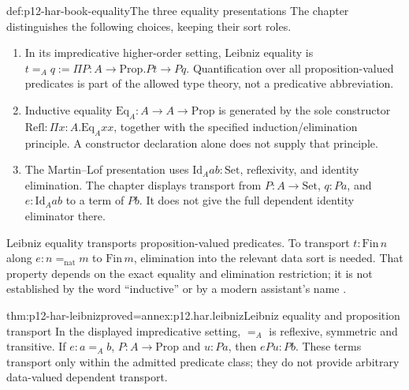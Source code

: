\begin{hbdefinition}{def:p12-har-book-equality}{The three equality presentations}
The chapter distinguishes the following choices, keeping their sort roles.
\begin{enumerate}
 \item In its impredicative higher-order setting, Leibniz equality is
 \(t=_A q:=\Pi P:A\to\mathrm{Prop}.Pt\to Pq\).
 Quantification over all proposition-valued predicates is part of the
 allowed type theory, not a predicative abbreviation.
 \item Inductive equality \(\mathrm{Eq}_A:A\to A\to\mathrm{Prop}\)
 is generated by the sole constructor
 \(\mathrm{Refl}:\Pi x:A.\mathrm{Eq}_A x x\), together with the
 specified induction/elimination principle. A constructor declaration
 alone does not supply that principle.
 \item The Martin--Lof presentation uses
 \(\mathrm{Id}_A a b:\mathrm{Set}\), reflexivity, and identity
 elimination. The chapter displays transport from
 \(P:A\to\mathrm{Set}\), \(q:Pa\), and
 \(e:\mathrm{Id}_A a b\) to a term of \(Pb\).
 It does not give the full dependent identity eliminator there.
\end{enumerate}
Leibniz equality transports proposition-valued predicates. To transport
\(t:\mathrm{Fin}\,n\) along \(e:n=_{\mathrm{nat}}m\) to
\(\mathrm{Fin}\,m\), elimination into the relevant data sort is
needed. That property depends on the exact equality and elimination
restriction; it is not established by the word ``inductive'' or by a
modern assistant's name \cite[pp.~1170--1171]{BarendregtGeuvers2001}.
\end{hbdefinition}

\begin{hbtheorem}{thm:p12-har-leibniz}{proved=annex:p12.har.leibniz}{Leibniz equality and proposition transport}
In the displayed impredicative setting, \(=_A\) is reflexive,
symmetric and transitive. If \(e:a=_A b\), \(P:A\to\mathrm{Prop}\)
and \(u:Pa\), then \(e P u:Pb\). These terms transport only within
the admitted predicate class; they do not provide arbitrary data-valued
dependent transport.
\end{hbtheorem}

